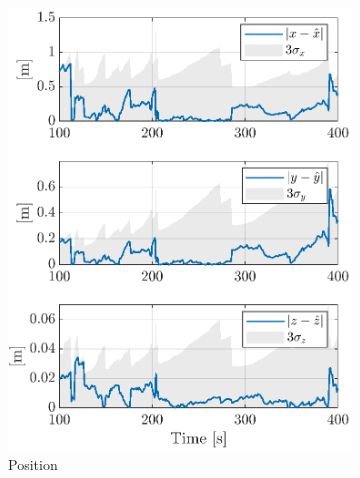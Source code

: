 \begin{figure}[!h]
    \begin{subfigure}[b]{0.48\textwidth}
    \centering
    \includegraphics[width=\linewidth]{Images/sigmapos.eps}
    \caption{Position}
    \label{fig:sigma:pos}
    \end{subfigure}\hfill
    \begin{subfigure}[b]{0.48\textwidth}
    \centering

\end{subfigure}
\end{figure}
